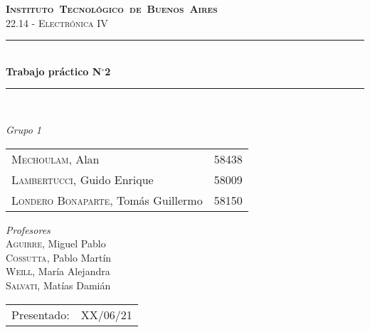 \begin{titlepage}
\newcommand{\HRule}{\rule{\linewidth}{0.5mm}}
\center
\mbox{\textsc{\LARGE \bfseries {Instituto Tecnológico de Buenos Aires}}}\\[1.5cm]
\textsc{\Large 22.14 - Electrónica IV}\\[0.5cm]


\HRule \\[0.6cm]
{ \Huge \bfseries Trabajo práctico N$^{\circ}$2}\\[0.4cm] 
\HRule \\[1.5cm]


{\large

\emph{Grupo 1}\\
\vspace{3pt}

\begin{tabular}{lr} 	
\textsc{Mechoulam}, Alan  &  58438\\
\textsc{Lambertucci}, Guido Enrique  & 58009 \\
\textsc{Londero Bonaparte}, Tomás Guillermo  & 58150 \\
\end{tabular}

\vspace{20pt}

\emph{Profesores}\\
\textsc{Aguirre}, Miguel Pablo\\
\textsc{Cossutta}, Pablo Martín\\
\textsc{Weill}, María Alejandra\\
\textsc{Salvati}, Matías Damián\\



\vspace{3pt}

\vspace{100pt}

\begin{tabular}{ll}

Presentado: & XX/06/21\\

\end{tabular}

}

\vfill

\end{titlepage}
